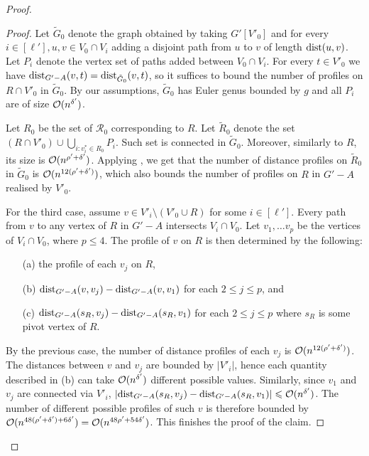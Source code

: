 \begin{proof}
\begin{proof}
Let $\tilde{G}_0$ denote the graph obtained by taking $G'[V'_0]$ and for every $i \in [\ell'], u, v \in V_0 \cap V_i$ adding a disjoint path from $u$ to $v$ of length $\mathrm{dist}(u, v)$. Let $P_i$ denote the vertex set of paths added between $V_0 \cap V_i$. For every $t \in V'_0$ we have $\mathrm{dist}_{G' - A}(v, t) = \mathrm{dist}_{\tilde{G}_0}(v, t)$, so it suffices to bound the number of profiles on $R \cap V'_0$ in $\tilde{G}_0$. By our assumptions, $\tilde{G}_0$ has Euler genus bounded by $g$ and all $P_i$ are of size $\mathcal{O}(n^{\delta'})$.

Let $R_0$ be the set of $\mathcal{R}_0$ corresponding to $R$. Let $\tilde{R}_0$ denote the set $(R \cap V'_0) \cup \bigcup_{i : v^*_i \in R_0} P_i$. Such set is connected in $\tilde{G}_0$. Moreover, similarly to $R$, its size is $\mathcal{O}(n^{\rho' + \delta'})$. Applying , we get that the number of distance profiles on $\tilde{R}_0$ in $\tilde{G}_0$ is $\mathcal{O}(n^{12(\rho' + \delta')})$, which also bounds the number of profiles on $R$ in $G' - A$ realised by $V'_0$.

For the third case, assume $v \in V'_i \setminus (V'_0 \cup R)$ for some $i\in [\ell']$. Every path from $v$ to any vertex of $R$ in $G' - A$ intersects $V_i \cap V_0$. Let $v_1, \dots v_p$ be the vertices of $V_i \cap V_0$, where $p \leq 4$. The profile of $v$ on $R$ is then determined by the following:
\begin{itemize}[nosep]
 \item[(a)] the profile of each $v_j$ on $R$,
 \item[(b)] $\mathrm{dist}_{G' - A}(v, v_j) - \mathrm{dist}_{G' - A}(v, v_1)$ for each $2 \leq j \leq p$, and
 \item[(c)] $\mathrm{dist}_{G' - A}(s_R, v_j) - \mathrm{dist}_{G' - A}(s_R, v_1)$ for each $2 \leq j \leq p$ where $s_R$ is some pivot vertex of $R$.
\end{itemize}
By the previous case, the number of distance profiles of each $v_j$ is $\mathcal{O}(n^{12(\rho' + \delta')})$. The distances between $v$ and $v_j$ are bounded by $|V'_i|$, hence each quantity described in (b) can take $\mathcal{O}(n^{\delta'})$ different possible values. Similarly, since $v_1$ and $v_j$ are connected via $V'_i$, $|\mathrm{dist}_{G' - A}(s_R, v_j) - \mathrm{dist}_{G' - A}(s_R, v_1)| \leqslant \mathcal{O}(n^{\delta'})$. The number of different possible profiles of such $v$ is therefore bounded by $\mathcal{O}(n^{48(\rho' + \delta') + 6\delta'}) = \mathcal{O}(n^{48\rho' + 54\delta'})$. This finishes the proof of the claim.
\end{proof}


\end{proof}
